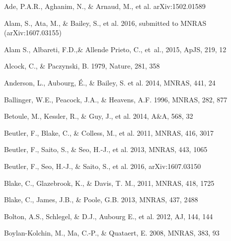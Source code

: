 \documentclass[iop]{emulateapj}
\begin{document}
\begin{thebibliography}{}

Ade, P.A.R., Aghanim, N., \& Arnaud, M., et al. arXiv:1502.01589

Alam, S., Ata, M., \& Bailey, S., et al. 2016,
submitted to MNRAS (arXiv:1607.03155)

{Alam} S., Albareti, F.D.,\& Allende Prieto, C., {et~al.}, 2015,  ApJS, 219, 12

Alcock, C., \& Paczynski, B. 1979, Nature, 281, 358  


Anderson, L., Aubourg, \'E., \& Bailey, S. et al. 2014, MNRAS, 441, 24  
  

Ballinger, W.E., Peacock, J.A., \& Heavens, A.F. 1996, MNRAS, 282, 877  

Betoule, M., Kessler, R., \& Guy, J., et al. 2014, A\&A, 568, 32


Beutler, F., Blake, C., \& Colless, M., et al. 2011, MNRAS, 416, 3017

Beutler, F., Saito, S., \& Seo, H.-J., et al. 2013, MNRAS, 443, 1065

Beutler, F., Seo, H.-J., \& Saito, S., et al. 2016,
arXiv:1607.03150

Blake, C., Glazebrook, K., \& Davis, T. M., 2011, MNRAS, 418, 1725  

Blake, C., James, J.B., \& Poole, G.B. 2013, MNRAS, 437, 2488

Bolton, A.S., Schlegel, \& D.J., Aubourg E., et al. 2012, AJ, 144, 144

Boylan-Kolchin, M., Ma, C.-P., \& Quataert, E. 2008, MNRAS, 383, 93



\end{thebibliography}
\end{document}
